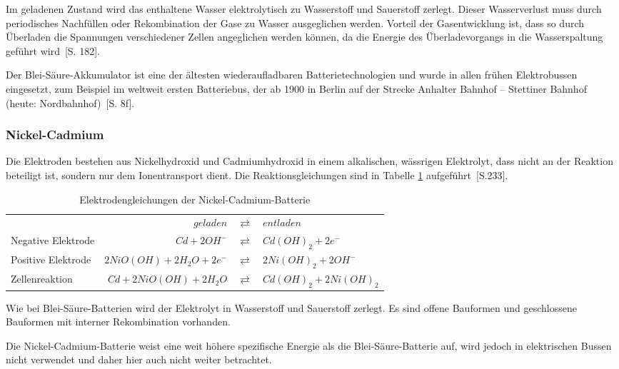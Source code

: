 Im geladenen Zustand wird das enthaltene Wasser elektrolytisch zu Wasserstoff und Sauerstoff zerlegt. Dieser Wasserverlust muss durch periodisches Nachfüllen oder Rekombination der Gase zu Wasser ausgeglichen werden. Vorteil der Gasentwicklung ist, dass so durch Überladen die Spannungen verschiedener Zellen angeglichen werden können, da die Energie des Überladevorgangs in die Wasserspaltung geführt wird~\cite{tub_aleph001746639}[S. 182].

Der Blei-Säure-Akkumulator ist eine der ältesten wiederaufladbaren Batterietechnologien und wurde in allen frühen Elektrobussen eingesetzt, zum Beispiel im weltweit ersten Batteriebus, der ab 1900 in Berlin auf der Strecke Anhalter Bahnhof – Stettiner Bahnhof (heute: Nordbahnhof)~\cite{Risch:1957}[S. 8f].

\subsubsection{Nickel-Cadmium}
Die Elektroden bestehen aus Nickelhydroxid und Cadmiumhydroxid in einem alkalischen, wässrigen Elektrolyt, dass nicht an der Reaktion beteiligt ist, sondern nur dem Ionentransport dient. Die Reaktionsgleichungen sind in Tabelle \ref{NiCd} aufgeführt~\cite{Sterner:2014}[S.233].

\begin{table}\centering
	\begin{tabularx}{\linewidth}{XrcX}
		\toprule
		&               $geladen$ & $\rightleftarrows$ & $entladen$             \\
		Negative Elektrode &            $Cd + 2OH^-$ & $\rightleftarrows$ & $Cd(OH)_2 + 2e^-$      \\
		Positive Elektrode & $2NiO(OH) + 2H_2O + 2e^-$ & $\rightleftarrows$ & $2Ni(OH)_2 + 2OH^-$    \\ \midrule
		Zellenreaktion     &   $Cd + 2NiO(OH) + 2H_2O$ & $\rightleftarrows$ & $Cd(OH)_2 + 2Ni(OH)_2$ \\ \bottomrule
	\end{tabularx}
	\caption{Elektrodengleichungen der Nickel-Cadmium-Batterie}
	\label{NiCd}
\end{table}

Wie bei Blei-Säure-Batterien wird der Elektrolyt in Wasserstoff und Sauerstoff zerlegt. Es sind offene Bauformen und geschlossene Bauformen mit interner Rekombination vorhanden.

Die Nickel-Cadmium-Batterie weist eine weit höhere spezifische Energie als die Blei-Säure-Batterie auf, wird jedoch in elektrischen Bussen nicht verwendet und daher hier auch nicht weiter betrachtet. 

